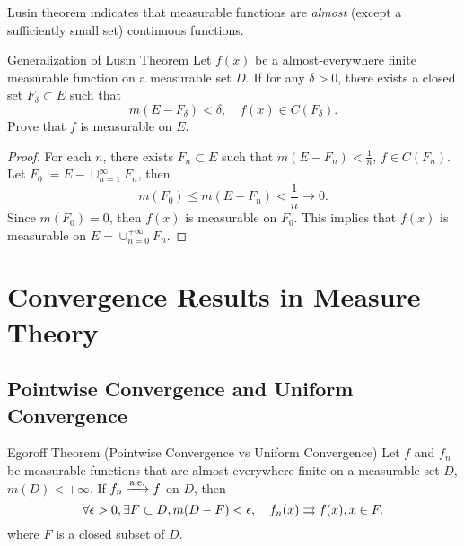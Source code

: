 \begin{note}
  Lusin theorem indicates that measurable functions are
  \emph{almost} (except a sufficiently small set) continuous functions.
\end{note}

\begin{example}{Generalization of Lusin Theorem}{}
  Let $f(x)$ be a almost-everywhere finite measurable function on a measurable set $D$.
  If for any $\delta > 0$, there exists a closed set $F_{\delta} \subset E$ such that
  \begin{equation}
    m (E - F_{\delta}) < \delta, \quad f(x) \in C(F_{\delta}).
  \end{equation}
  Prove that $f$ is measurable on $E$.
\end{example}

\begin{proof}
  For each $n$, there exists $F_n \subset E$ such that $m(E - F_n) < \frac{1}{n}$,
  $f \in C(F_n)$.
  Let $F_0 := E - \cup _{n = 1}^{\infty}F_n$, then
  \begin{equation}
    m(F_0) \leq m (E - F_n) < \frac{1}{n} \rightarrow 0.
  \end{equation}
  Since $m(F_0) = 0$, then $f(x)$ is measurable on $F_0$.
  This implies that $f(x)$ is measurable on $E = \cup _{n = 0}^{+\infty}F_n$.
\end{proof}

\section{Convergence Results in Measure Theory}

\subsection{Pointwise Convergence and Uniform Convergence}

\begin{theorem}{Egoroff Theorem (Pointwise Convergence vs Uniform Convergence)}{}
  Let $f$ and $f_n$ be measurable functions that are almost-everywhere finite
  on a measurable set $D$, $m(D) < +\infty$.
  If $f_n \xrightarrow{\text{a.e.}} f$ on $D$,
  then
  \begin{equation}
    \forall \epsilon > 0, \exists F \subset D, m(D - F) < \epsilon, \quad
    f_n(x) \rightrightarrows f(x), x \in F.
  \end{equation}
  where $F$ is a closed subset of $D$.
\end{theorem}

